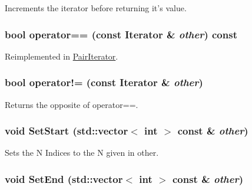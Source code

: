 Increments the iterator before returning it's value. \hypertarget{classJKBuilder_1_1Iterator_a1ea001976a5bc8ae8dc365e2a912b59a}{
\subsubsection[{operator==}]{\setlength{\rightskip}{0pt plus 5cm}bool operator== (const {\bf Iterator} \& {\em other}) const}}
\label{classJKBuilder_1_1Iterator_a1ea001976a5bc8ae8dc365e2a912b59a}


Reimplemented in \hyperlink{classJKBuilder_1_1PairIterator_a6b4e430066f478e5e400edd39ef93968}{PairIterator}.\hypertarget{classJKBuilder_1_1Iterator_a8c06af8ae0d9d1614ae9f81629275926}{
\subsubsection[{operator!=}]{\setlength{\rightskip}{0pt plus 5cm}bool operator!= (const {\bf Iterator} \& {\em other})}}
\label{classJKBuilder_1_1Iterator_a8c06af8ae0d9d1614ae9f81629275926}


Returns the opposite of operator==. \hypertarget{classJKBuilder_1_1Iterator_aa83de505e29125c1d3ac7bb1b13ca15a}{
\subsubsection[{SetStart}]{\setlength{\rightskip}{0pt plus 5cm}void SetStart (std::vector$<$ int $>$ const \& {\em other})}}
\label{classJKBuilder_1_1Iterator_aa83de505e29125c1d3ac7bb1b13ca15a}


Sets the N Indices to the N given in other. \hypertarget{classJKBuilder_1_1Iterator_aad84ec668b5f41210db34c540aaa31fc}{
\subsubsection[{SetEnd}]{\setlength{\rightskip}{0pt plus 5cm}void SetEnd (std::vector$<$ int $>$ const \& {\em other})}}
\label{classJKBuilder_1_1Iterator_aad84ec668b5f41210db34c540aaa31fc}


